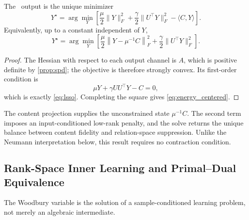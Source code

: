 \begin{theorem}
\label{thm:energy}
The \LSSO\ output is the unique minimizer
\begin{equation}
  Y^\star
  =\arg\min_Y
  \left[
    \frac{\mu}{2}\lVert Y\rVert_F^2
    +\frac{\gamma}{2}\lVert U^\top Y\rVert_F^2
    -\langle C,Y\rangle
  \right].
  \label{eq:energy}
\end{equation}
Equivalently, up to a constant independent of $Y$,
\begin{equation}
  Y^\star
  =\arg\min_Y
  \left[
    \frac{\mu}{2}\left\lVert Y-\mu^{-1}C\right\rVert_F^2
    +\frac{\gamma}{2}\lVert U^\top Y\rVert_F^2
  \right].
  \label{eq:energy_centered}
\end{equation}
\end{theorem}
\begin{proof}
The Hessian with respect to each output channel is $A$, which is positive definite by \cref{prop:spd}; the objective is therefore strongly convex. Its first-order condition is
\[
  \mu Y+\gamma UU^\top Y-C=0,
\]
which is exactly \cref{eq:lsso}. Completing the square gives \cref{eq:energy_centered}.
\end{proof}

The content projection supplies the unconstrained state $\mu^{-1}C$. The second term imposes an input-conditioned low-rank penalty, and the solve returns the unique balance between content fidelity and relation-space suppression. Unlike the Neumann interpretation below, this result requires no contraction condition.

\subsection{Rank-Space Inner Learning and Primal--Dual Equivalence}

The Woodbury variable is the solution of a sample-conditioned learning
problem, not merely an algebraic intermediate.

